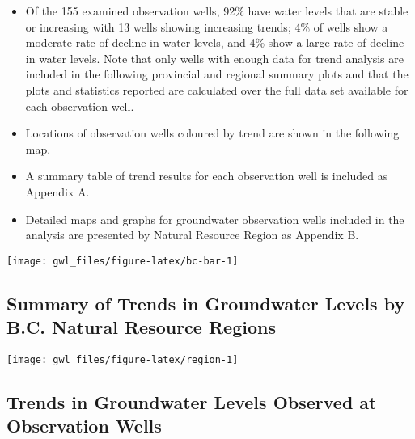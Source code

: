 \documentclass[
]{article}
\providecommand{\tightlist}{%
  \setlength{\itemsep}{0pt}\setlength{\parskip}{0pt}}
\begin{document}
\begin{itemize}
\tightlist
\item
  Of the 155 examined observation wells, 92\% have water levels that are
  stable or increasing with 13 wells showing increasing trends; 4\% of
  wells show a moderate rate of decline in water levels, and 4\% show a
  large rate of decline in water levels. Note that only wells with
  enough data for trend analysis are included in the following
  provincial and regional summary plots and that the plots and
  statistics reported are calculated over the full data set available
  for each observation well.
\item
  Locations of observation wells coloured by trend are shown in the
  following map.
\item
  A summary table of trend results for each observation well is included
  as Appendix A.
\item
  Detailed maps and graphs for groundwater observation wells included in
  the analysis are presented by Natural Resource Region as Appendix B.
\end{itemize}

\vspace{60pt}

\begin{center}\texttt{[image: gwl\_files/figure-latex/bc-bar-1]} \end{center}

\newpage

\hypertarget{summary-of-trends-in-groundwater-levels-by-b.c.-natural-resource-regions}{%
\subsection{Summary of Trends in Groundwater Levels by B.C. Natural
Resource
Regions}\label{summary-of-trends-in-groundwater-levels-by-b.c.-natural-resource-regions}}

\vspace{60pt}

\begin{center}\texttt{[image: gwl\_files/figure-latex/region-1]} \end{center}

\newpage

\hypertarget{trends-in-groundwater-levels-observed-at-observation-wells}{%
\subsection{Trends in Groundwater Levels Observed at Observation
Wells}\label{trends-in-groundwater-levels-observed-at-observation-wells}}
\end{document}
